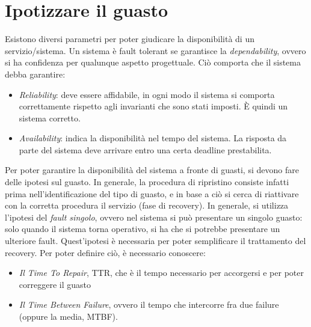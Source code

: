 \section{Ipotizzare il guasto}
Esistono diversi parametri per poter giudicare la disponibilità di un
servizio/sistema.
Un sistema è fault tolerant se garantisce la \textit{dependability}, ovvero si
ha confidenza per qualunque aspetto
progettuale. Ciò comporta che il sistema debba garantire:
\begin{itemize}
 \item \textit{Reliability}: deve essere affidabile, in ogni modo il sistema si
comporta correttamente rispetto agli
invarianti che sono stati imposti. È quindi un sistema corretto.
 \item \textit{Availability}: indica la disponibilità nel tempo del sistema. La
risposta da parte del sistema deve
arrivare entro una certa deadline prestabilita.
\end{itemize}
Per poter garantire la disponibilità del sistema a fronte di guasti, si devono
fare delle ipotesi sul guasto. In
generale, la procedura di ripristino consiste infatti prima
nell'identificazione del tipo di guasto, e in base a ciò si
cerca di riattivare con la corretta procedura il servizio (fase di recovery).
In generale, si utilizza l'ipotesi del \textit{fault singolo}, ovvero nel
sistema si può presentare un singolo guasto:
solo quando il sistema torna operativo, si ha che si potrebbe presentare un
ulteriore fault. Quest'ipotesi è necessaria
per poter semplificare il trattamento del recovery. Per poter definire ciò, è
necessario conoscere:
\begin{itemize}
 \item \textit{Il Time To Repair}, TTR, che è il tempo necessario per
accorgersi e per poter correggere il guasto
 \item \textit{Il Time Between Failure}, ovvero il tempo che intercorre fra due
failure (oppure la media, MTBF).
\end{itemize}


